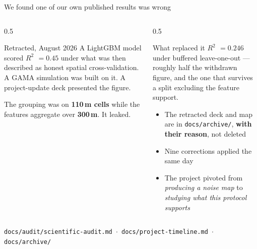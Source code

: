 \documentclass[aspectratio=169,10pt]{beamer}
\newcommand{\src}[1]{{\scriptsize\color{muted}\texttt{#1}}}
\newcommand{\up}[1]{\textcolor{good}{\textbf{#1}}}
\newcommand{\down}[1]{\textcolor{bad}{\textbf{#1}}}
\newcommand{\rr}{$R^2$}
\begin{document}
\begin{frame}{We found one of our own published results was wrong}
  \begin{columns}[T]
    \begin{column}{0.5\textwidth}
      \begin{alertblock}{Retracted, August 2026}
        A LightGBM model scored \down{\rr{} $= 0.45$} under what was then
        described as honest spatial cross-validation. A GAMA simulation was built on
        it. A project-update deck presented the figure.
        \vspace{.4em}

        The grouping was on \textbf{110\,m cells} while the features aggregate over
        \textbf{300\,m}. It leaked.
      \end{alertblock}
    \end{column}
    \begin{column}{0.5\textwidth}
      \begin{exampleblock}{What replaced it}
        \up{\rr{} $= 0.246$} under buffered leave-one-out --- roughly half
        the withdrawn figure, and the one that survives a split excluding the
        feature support.
      \end{exampleblock}
      \vspace{.3em}
      \begin{itemize}
        \item The retracted deck and map are in \texttt{docs/archive/}, \textbf{with
              their reason}, not deleted
        \item Nine corrections applied the same day
        \item The project pivoted from \emph{producing a noise map} to
              \emph{studying what this protocol supports}
      \end{itemize}
    \end{column}
  \end{columns}
  \vfill
  \src{docs/audit/scientific-audit.md \; $\cdot$ \; docs/project-timeline.md \; $\cdot$ \; docs/archive/}
\end{frame}
\end{document}
